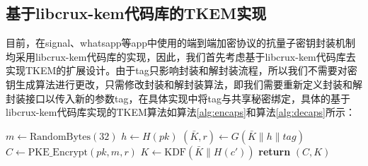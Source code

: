 



\subsection{基于libcrux-kem代码库的TKEM实现}
\label{libcrux}
目前，在signal、whatsapp等app中使用的端到端加密协议的抗量子密钥封装机制均采用libcrux-kem代码库的实现，因此，我们首先考虑基于libcrux-kem代码库去实现TKEM的扩展设计。由于tag只影响封装和解封装流程，所以我们不需要对密钥生成算法进行更改，只需修改封装和解封装算法，即我们需要重新定义封装和解封装接口以传入新的参数tag，在具体实现中将tag与共享秘密绑定，具体的基于libcrux-kem代码库实现的TKEM算法如算法\ref{alg:encaps}和算法\ref{alg:decaps}所示：


\begin{algorithm}[htbp]
\caption{TKEM 封装流程 (Encaps\_with\_tag)}
\label{alg:encaps}
\begin{algorithmic}[1]
    \State $m \gets \text{RandomBytes}(32)$ 
    \State $h \gets H(pk)$
    \State $(\bar{K}, r) \gets G(\bar{K} \| h \| tag)$ 
    \State $C \gets \text{PKE\_Encrypt}(pk, m, r)$
    \State $K \gets \text{KDF}(\bar{K} \| H(c'))$
    \State \textbf{return} $(C, K)$
\EndProcedure
\end{algorithmic}
\end{algorithm}

